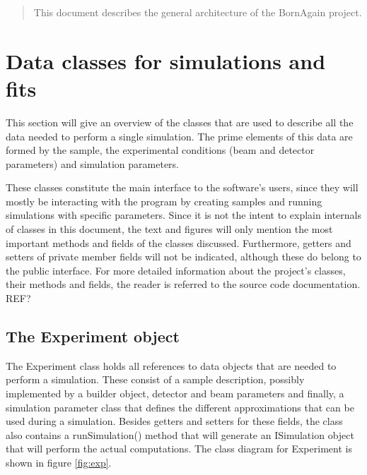 \documentclass[a4paper,10pt]{article}
\title{}
\author{}
\newcommand{\reffig}[1]{figure \ref{fig:#1}}
\begin{document}

\begin{abstract}
This document describes the general architecture of the BornAgain project.
\end{abstract}

\section{Data classes for simulations and fits}
This section will give an overview of the classes that are used to describe all the data needed to perform a single simulation. The prime elements of this data are formed by the sample, the experimental conditions (beam and detector parameters) and simulation parameters.

These classes constitute the main interface to the software's users, since they will mostly be interacting with the program by creating samples and running simulations with specific parameters. Since it is not the intent to explain internals of classes in this document, the text and figures will only mention the most important methods and fields of the classes discussed. Furthermore, getters and setters of private member fields will not be indicated, although these do belong to the public interface. For more detailed information about the project's classes, their methods and fields, the reader is referred to the source code documentation. REF?

\subsection{The Experiment object}
The Experiment class holds all references to data objects that are needed to perform a simulation. These consist of a sample description, possibly implemented by a builder object, detector and beam parameters and finally, a simulation parameter class that defines the different approximations that can be used during a simulation. Besides getters and setters for these fields, the class also contains a runSimulation() method that will generate an ISimulation object that will perform the actual computations. The class diagram for Experiment is shown in \reffig{exp}.
\end{document}
